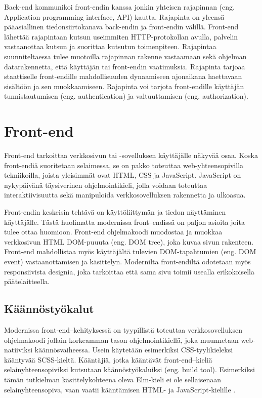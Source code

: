 Back-end kommunikoi front-endin kanssa jonkin yhteisen rajapinnan (eng. Application programming interface, API) kautta.
Rajapinta on yleensä pääasiallinen tiedonsiirtokanava back-endin ja front-endin välillä. Front-end lähettää rajapintaan
kutsun useimmiten HTTP-protokollan avulla, palvelin vastaanottaa kutsun ja suorittaa kutsutun toimenpiteen.
Rajapintaa suunniteltaessa tulee muotoilla rajapinnan rakenne vastaamaan sekä ohjelman datarakennetta, että käyttäjän
tai front-endin vaatimuksia. Rajapinta tarjoaa staattiselle front-endille mahdollisuuden dynaamiseen ajonaikana
haettavaan sisältöön ja sen muokkaamiseen. Rajapinta voi tarjota front-endille käyttäjän tunnistautumisen (eng.
authentication) ja valtuuttamisen (eng. authorization). \cite{fullstackdeveloper}

\section{Front-end}
Front-end tarkoittaa verkkosivun tai -sovelluksen käyttäjälle näkyvää osaa. Koska front-endiä suoritetaan selaimessa,
se on pakko toteuttaa web-yhteensopivilla tekniikoilla, joista yleisimmät ovat HTML, CSS ja JavaScript. JavaScript on
nykypäivänä täysiverinen ohjelmointikieli, jolla voidaan toteuttaa interaktiivisuutta sekä manipuloida verkkosovelluksen
rakennetta ja ulkoasua. \cite{fullstackdeveloper}

Front-endin keskeisin tehtävä on käyttöliittymän ja tiedon näyttäminen käyttäjälle. Tästä huolimatta modernissa
front–endissä on paljon asioita joita tulee ottaa huomioon. Front-end ohjelmakoodi muodostaa ja muokkaa verkkosivun HTML
DOM-puuuta (eng. DOM tree), joka kuvaa sivun rakenteen. Front-end mahdollistaa myös käyttäjältä tulevien DOM-tapahtumien
(eng. DOM event) vastaanottamisen ja käsittelyn. Modernilta front-endiltä odotetaan myös responsiivista designia, joka
tarkoittaa että sama sivu toimii usealla erikokoisella päätelaitteella. \cite{bignerdfrontend}

\subsection{Käännöstyökalut}
Modernissa front-end–kehityksessä on tyypillistä toteuttaa verkkosovelluksen ohjelmakoodi jollain korkeamman tason
ohjelmointikiellä, joka muunnetaan web-natiiviksi käännösvaiheessa. Usein käytetään esimerkiksi CSS-tyylikieleksi
kääntyvää SCSS-kieltä. Kääntäjiä, jotka kääntävät front-end–kieliä selainyhteensopiviksi kutsutaan käännöstyökaluiksi
(eng. build tool). Esimerkiksi tämän tutkielman käsittelykohteena oleva Elm-kieli ei ole sellaisenaan
selainyhteensopiva, vaan vaatii kääntämisen HTML- ja JavaScript-kielille \cite{elmlang}. \cite{fullstackdeveloper}

